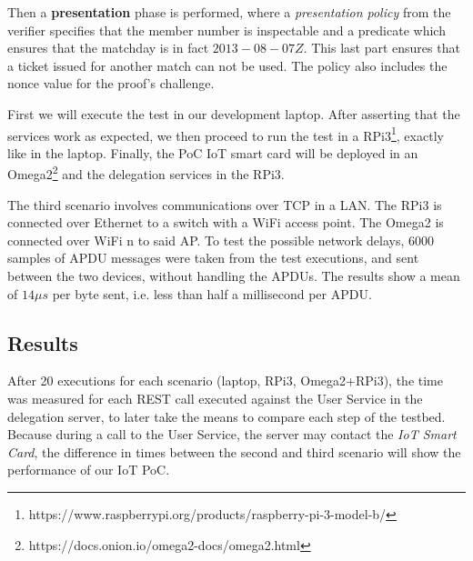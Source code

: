 Then a \textbf{presentation} phase is performed, where a \textit{presentation policy} from the verifier specifies that the member number is inspectable and a predicate which ensures that the matchday is in fact $2013-08-07Z$. This last part ensures that a ticket issued for another match can not be used. The policy also includes the nonce value for the proof's challenge.

\hfil


First we will execute the test in our development laptop. After asserting that the services work as expected, we then proceed to run the test in a RPi3\footnote{{https://www.raspberrypi.org/products/raspberry-pi-3-model-b/}}, exactly like in the laptop. Finally, the PoC IoT smart card will be deployed in an Omega2\footnote{{https://docs.onion.io/omega2-docs/omega2.html}} and the delegation services in the RPi3.

\hfil

The third scenario involves communications over TCP in a LAN. The RPi3 is connected over Ethernet to a switch with a WiFi access point. The Omega2 is connected over WiFi n to said AP. To test the possible network delays, $6000$ samples of APDU messages were taken from the test executions, and sent between the two devices, without handling the APDUs. The results show a mean of $14\mu s$ per byte sent, i.e. less than half a millisecond per APDU.



\subsection{Results}

After 20 executions for each scenario (laptop, RPi3, Omega2+RPi3), the time was measured for each REST call executed against the User Service in the delegation server, to later take the means to compare each step of the testbed. Because during a call to the User Service, the server may contact the \textit{IoT Smart Card}, the difference in times between the second and third scenario will show the performance of our IoT PoC.

